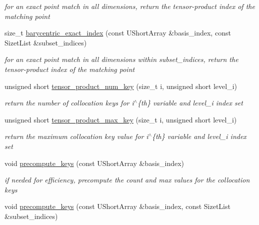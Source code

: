 \begin{DoxyCompactItemize}
\begin{DoxyCompactList}\small\item\em for an exact point match in all dimensions, return the tensor-\/product index of the matching point \end{DoxyCompactList}\item 
size\+\_\+t \hyperlink{classPecos_1_1SharedHierarchInterpPolyApproxData_ac30b80dcedaab190a93a5c381ca1468d}{barycentric\+\_\+exact\+\_\+index} (const U\+Short\+Array \&basis\+\_\+index, const Sizet\+List \&subset\+\_\+indices)\label{classPecos_1_1SharedHierarchInterpPolyApproxData_ac30b80dcedaab190a93a5c381ca1468d}

\begin{DoxyCompactList}\small\item\em for an exact point match in all dimensions within subset\+\_\+indices, return the tensor-\/product index of the matching point \end{DoxyCompactList}\item 
unsigned short \hyperlink{classPecos_1_1SharedHierarchInterpPolyApproxData_aebc21f7540417a6aa2671b7ead1ff376}{tensor\+\_\+product\+\_\+num\+\_\+key} (size\+\_\+t i, unsigned short level\+\_\+i)
\begin{DoxyCompactList}\small\item\em return the number of collocation keys for i$^\wedge$\{th\} variable and level\+\_\+i index set \end{DoxyCompactList}\item 
unsigned short \hyperlink{classPecos_1_1SharedHierarchInterpPolyApproxData_a48c241725ff74c5f3d500b287cb5d5b5}{tensor\+\_\+product\+\_\+max\+\_\+key} (size\+\_\+t i, unsigned short level\+\_\+i)
\begin{DoxyCompactList}\small\item\em return the maximum collocation key value for i$^\wedge$\{th\} variable and level\+\_\+i index set \end{DoxyCompactList}\item 
void \hyperlink{classPecos_1_1SharedHierarchInterpPolyApproxData_af3fdba189ef1be4278ed198f21621ebb}{precompute\+\_\+keys} (const U\+Short\+Array \&basis\+\_\+index)
\begin{DoxyCompactList}\small\item\em if needed for efficiency, precompute the count and max values for the collocation keys \end{DoxyCompactList}\item 
void \hyperlink{classPecos_1_1SharedHierarchInterpPolyApproxData_a8a006b2611ce5fa80285ff6c3dad67c0}{precompute\+\_\+keys} (const U\+Short\+Array \&basis\+\_\+index, const Sizet\+List \&subset\+\_\+indices)

\end{DoxyCompactItemize}
